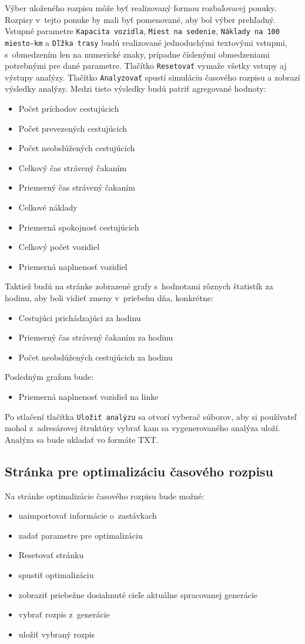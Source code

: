 Výber uloženého rozpisu môže byť realizovaný formou rozbaľovacej ponuky.
Rozpisy v~tejto ponuke by mali byť pomenované, aby bol výber prehľadný.
Vstupné parametre \texttt{Kapacita vozidla}, \texttt{Miest na sedenie}, \texttt{Náklady na 100 miesto-km} a \texttt{Dľžka trasy} budú realizované jednoduchými textovými vstupmi, s~obmedzením len na numerické znaky, prípadne číslenými obmedzeniami potrebnými pre dané parametre.
Tlačítko \texttt{Resetovať} vymaže všetky vstupy aj výstupy analýzy.
Tlačítko \texttt{Analyzovať} spustí simuláciu časového rozpisu a zobrazí výsledky analýzy.
Medzi tieto výsledky budú patriť agregované hodnoty:
\begin{itemize}
  \item Počet príchodov cestujúcich
  \item Počet prevezených cestujúcich
  \item Počet neobslúžených cestujúcich
  \item Celkový čas strávený čakaním
  \item Priemerný čas strávený čakaním
  \item Celkové náklady
  \item Priemerná spokojnosť cestujúcich
  \item Celkový počet vozidiel
  \item Priemerná naplnenosť vozidiel
\end{itemize}
Taktiež budú na stránke zobrazené grafy s~hodnotami rôznych štatistík za hodinu, aby boli vidieť zmeny v~priebehu dňa, konkrétne:
\begin{itemize}
  \item Cestujúci prichádzajúci za hodinu
  \item Priemerný čas strávený čakaním za hodinu
  \item Počet neobslúžených cestujúcich za hodinu
\end{itemize}
Posledným grafom bude:
\begin{itemize}
  \item Priemerná naplnenosť vozidiel na linke
\end{itemize}
Po stlačení tlačítka \texttt{Uložiť analýzu} sa otvorí vyberač súborov, aby si používateľ mohol z~adresárovej štruktúry vybrať kam sa vygenerovaného analýza uloží.
Analýza sa bude ukladať vo formáte TXT.

\newpage
\subsection*{Stránka pre optimalizáciu časového rozpisu}
Na stránke optimalizácie časového rozpisu bude možné:
\begin{itemize}
  \item naimportovať informácie o~zastávkach
  \item zadať parametre pre optimalizáciu
  \item Resetovať stránku
  \item spustiť optimalizáciu
  \item zobraziť priebežne dosiahnuté cieľe aktuálne spracovanej generácie
  \item vybrať rozpis z~generácie
  \item uložiť vybraný rozpis
\end{itemize}

